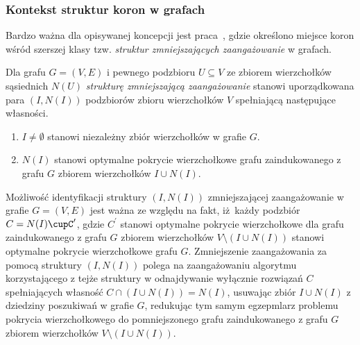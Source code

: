 \subsubsection{\textbf{Kontekst struktur koron w grafach}}
\label{sss_kernelization_crown_context}
\par{
  Bardzo ważna dla opisywanej koncepcji jest praca~\cite{chlebik:crown}, gdzie określono miejsce koron wśród szerszej klasy tzw. \emph{struktur zmniejszających zaangażowanie} w grafach.
  \begin{definition}
    Dla grafu $G=(V, E)$ i pewnego podzbioru $U \subseteq V$ ze zbiorem wierzchołków sąsiednich $N(U)$ \emph{strukturę zmniejszającą zaangażowanie} stanowi uporządkowana para $(I, N(I))$ podzbiorów zbioru wierzchołków $V$ spełniającą następujące własności.
    \begin{enumerate}
      \item $I \neq \emptyset$ stanowi niezależny zbiór wierzchołków w grafie $G$.
      \item $N(I)$ stanowi optymalne pokrycie wierzchołkowe grafu zaindukowanego z grafu $G$ zbiorem wierzchołków $I \cup N(I)$.
    \end{enumerate}
  \end{definition}
  Możliwość identyfikacji struktury $(I, N(I))$ zmniejszającej zaangażowanie w grafie $G=(V, E)$ jest ważna ze względu na fakt, iż każdy podzbiór $C=N(I)\cupC^\prime$, gdzie $C^\prime$ stanowi optymalne pokrycie wierzchołkowe dla grafu zaindukowanego z grafu $G$ zbiorem wierzchołków $V \setminus (I\cup N(I))$ stanowi optymalne pokrycie wierzchołkowe grafu $G$.
  Zmniejszenie zaangażowania za pomocą struktury $(I, N(I))$ polega na zaangażowaniu algorytmu korzystającego z tejże struktury w odnajdywanie wyłącznie rozwiązań $C$ spełniających własność $C \cap (I \cup N(I)) = N(I)$, usuwając zbiór $I \cup N(I)$ z dziedziny poszukiwań w grafie $G$, redukując tym samym egzepmlarz problemu pokrycia wierzchołkowego do pomniejszonego grafu zaindukowanego z grafu $G$ zbiorem wierzchołków $V \setminus (I \cup N(I))$.
}
